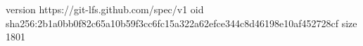 version https://git-lfs.github.com/spec/v1
oid sha256:2b1a0bb0f82c65a10b59f3cc6fc15a322a62efce344c8d46198e10af452728cf
size 1801
